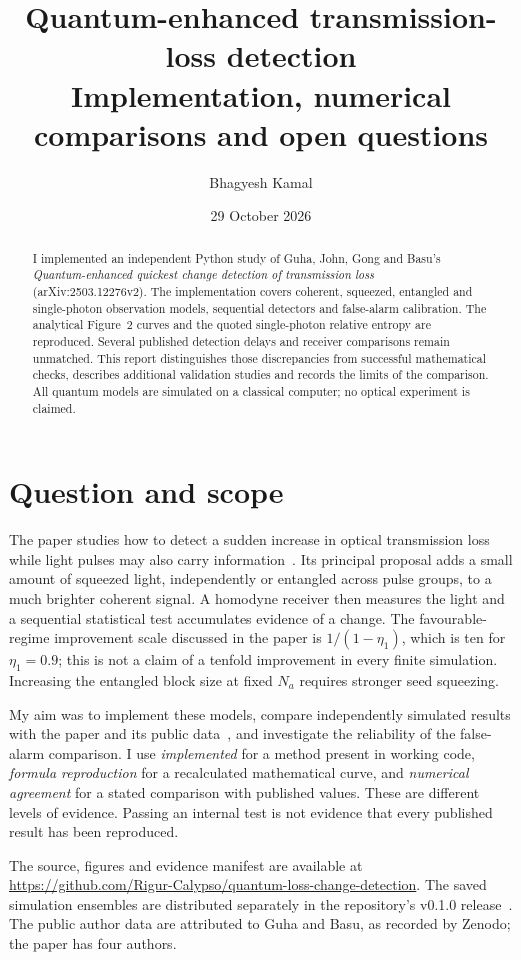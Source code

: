 \documentclass[11pt,a4paper]{article}
\title{Quantum-enhanced transmission-loss detection\\
\large Implementation, numerical comparisons and open questions}
\author{Bhagyesh Kamal}
\date{29 October 2026}
\newcommand{\repo}{\url{https://github.com/Rigur-Calypso/quantum-loss-change-detection}}
\begin{document}
\maketitle
\begin{abstract}
I implemented an independent Python study of Guha, John, Gong and Basu's
\emph{Quantum-enhanced quickest change detection of transmission loss}
(arXiv:2503.12276v2). The implementation covers coherent, squeezed,
entangled and single-photon observation models, sequential detectors and
false-alarm calibration. The analytical Figure~2 curves and the quoted
single-photon relative entropy are reproduced. Several published detection
delays and receiver comparisons remain unmatched. This report distinguishes
those discrepancies from successful mathematical checks, describes additional
validation studies and records the limits of the comparison. All quantum
models are simulated on a classical computer; no optical experiment is claimed.
\end{abstract}

\section{Question and scope}
The paper studies how to detect a sudden increase in optical transmission loss
while light pulses may also carry information~\cite{paper}. Its principal
proposal adds a small amount of squeezed light, independently or entangled
across pulse groups, to a much brighter coherent signal. A homodyne receiver
then measures the light and a sequential statistical test accumulates evidence
of a change. The favourable-regime improvement scale discussed in the paper is
$1/(1-\eta_1)$, which is ten for $\eta_1=0.9$; this is not a claim of a
tenfold improvement in every finite simulation. Increasing the entangled block
size at fixed $N_a$ requires stronger seed squeezing.

My aim was to implement these models, compare independently simulated results
with the paper and its public data~\cite{dataset}, and investigate the reliability
of the false-alarm comparison. I use \emph{implemented} for a method present in
working code, \emph{formula reproduction} for a recalculated mathematical curve,
and \emph{numerical agreement} for a stated comparison with published values.
These are different levels of evidence. Passing an internal test is not
evidence that every published result has been reproduced.

The source, figures and evidence manifest are available at \repo.
The saved simulation ensembles are distributed separately in the repository's
v0.1.0 release~\cite{code}. The public author data are attributed to Guha and
Basu, as recorded by Zenodo; the paper has four authors.
\end{document}
